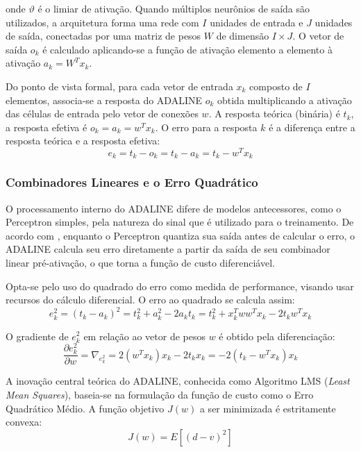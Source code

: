 onde $\vartheta$ é o limiar de ativação. Quando múltiplos neurônios de saída são utilizados, a arquitetura forma uma rede com $I$ unidades de entrada e $J$ unidades de saída, conectadas por uma matriz de pesos $W$ de dimensão $I \times J$. O vetor de saída $o_k$ é calculado aplicando-se a função de ativação elemento a elemento à ativação $a_k = W^T x_k$.

Do ponto de vista formal, para cada vetor de entrada $x_k$ composto de $I$ elementos, associa-se a resposta do ADALINE $o_k$ obtida multiplicando a ativação das células de entrada pelo vetor de conexões $w$. A resposta teórica (binária) é $t_k$, a resposta efetiva é $o_k = a_k = w^T x_k$. O erro para a resposta $k$ é a diferença entre a resposta teórica e a resposta efetiva:
\begin{equation}
e_k = t_k - o_k = t_k - a_k = t_k - w^T x_k
\end{equation}

\subsubsection{Combinadores Lineares e o Erro Quadrático}

O processamento interno do ADALINE difere de modelos antecessores, como o Perceptron simples, pela natureza do sinal que é utilizado para o treinamento. De acordo com , enquanto o Perceptron quantiza sua saída antes de calcular o erro, o ADALINE calcula seu erro diretamente a partir da saída de seu combinador linear pré-ativação, o que torna a função de custo diferenciável.

Opta-se pelo uso do quadrado do erro como medida de performance, visando usar recursos do cálculo diferencial. O erro ao quadrado se calcula assim:
\begin{equation}
e_k^2 = (t_k - a_k)^2 = t_k^2 + a_k^2 - 2a_k t_k = t_k^2 + x_k^T w w^T x_k - 2t_k w^T x_k
\end{equation}

O gradiente de $e_k^2$ em relação ao vetor de pesos $w$ é obtido pela diferenciação:
\begin{equation}
\frac{\partial e_k^2}{\partial w} = \nabla_{e_k^2} = 2(w^T x_k) x_k - 2t_k x_k = -2(t_k - w^T x_k) x_k
\end{equation}

A inovação central teórica do ADALINE, conhecida como Algoritmo LMS (\textit{Least Mean Squares}), baseia-se na formulação da função de custo como o Erro Quadrático Médio. A função objetivo $J(w)$ a ser minimizada é estritamente convexa:
\begin{equation}
J(w) = E\left[(d - v)^2\right]
\end{equation}

